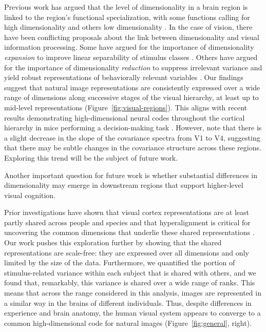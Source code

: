 \documentclass[10pt]{article}
\begin{document}
Previous work has argued that the level of dimensionality in a brain region is linked to the region's functional specialization, with some functions calling for high dimensionality and others low dimensionality \autocites[e.g.][]{Fusi2016,CaycoGajic2019}. In the case of vision, there have been conflicting proposals about the link between dimensionality and visual information processing. Some have argued for the importance of dimensionality \emph{expansion} to improve linear separability of stimulus classes \autocite{Elmoznino2024,Babadi2014}. Others have argued for the importance of dimensionality \emph{reduction} to suppress irrelevant variance and yield robust representations of behaviorally relevant variables \autocite{Ansuini2019,Cohen2020,Lehky2016,Fusi2016}. Our findings suggest that natural image representations are consistently expressed over a wide range of dimensions along successive stages of the visual hierarchy, at least up to mid-level representations (Figure~\ref{fig:visual-regions}). This aligns with recent results demonstrating high-dimensional neural codes throughout the cortical hierarchy in mice performing a decision-making task \autocite{Posani2024}. However, note that there is a slight decrease in the slope of the covariance spectra from V1 to V4, suggesting that there may be subtle changes in the covariance structure across these regions. Exploring this trend will be the subject of future work.

Another important question for future work is whether substantial differences in dimensionality may emerge in downstream regions that support higher-level visual cognition.

Prior investigations have shown that visual cortex representations are at least partly shared across people and species \autocite{Haxby2011,Kriegeskorte2008} and that hyperalignment is critical for uncovering the common dimensions that underlie these shared representations \autocite{Haxby2011,Haxby2020}. Our work pushes this exploration further by showing that the shared representations are scale-free: they are expressed over all dimensions and only limited by the size of the data. Furthermore, we quantified the portion of stimulus-related variance within each subject that is shared with others, and we found that, remarkably, this variance is shared over a wide range of ranks. This means that across the range considered in this analysis, images are represented in a similar way in the brains of different individuals. Thus, despite differences in experience and brain anatomy, the human visual system appears to converge to a common high-dimensional code for natural images (Figure~\ref{fig:general}, right).
\end{document}
